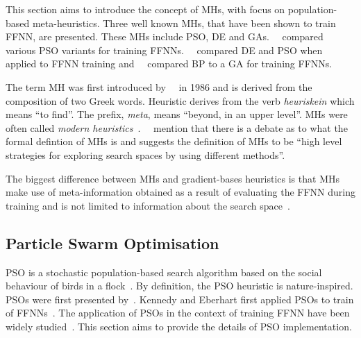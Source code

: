 This section aims to introduce the concept of \acp{MH}, with focus on population-based meta-heuristics. Three well known \acp{MH}, that have been shown to train \acs{FFNN}, are presented. These \acp{MH} include \acf{PSO}, \acf{DE} and \acfp{GA}.~\citeauthor{ref:carvalho:2006}~\cite{ref:carvalho:2006} compared various \acs{PSO} variants for training \acp{FFNN}.~\citeauthor{ref:espinal:2011}~\cite{ref:espinal:2011} compared \acs{DE} and \acs{PSO} when applied to \acs{FFNN} training and~\citeauthor{ref:gupta:1999}~\cite{ref:gupta:1999} compared \acs{BP} to a \acs{GA} for training \acp{FFNN}.

The term \acf{MH} was first introduced by~\citeauthor{ref:glover:1986}~\cite{ref:glover:1986} in 1986 and is derived from the composition of two Greek words. Heuristic derives from the verb \textit{heuriskein} which means ``to find''. The prefix, \textit{meta}, means ``beyond, in an upper level''. \Acp{MH} were often called \textit{modern heuristics}~\cite{ref:reeves:1993}.~\citeauthor{ref:blum:2003}~\cite{ref:blum:2003} mention that there is a debate as to what the formal defintion of \acp{MH} is and suggests the definition of \acp{MH} to be ``high level strategies for exploring search spaces by using different methods''.

The biggest difference between \acp{MH} and gradient-bases heuristics is that
\acp{MH} make use of meta-information obtained as a result of evaluating the \acs{FFNN} during training and is not limited to information about the search space~\cite{ref:blum:2003}.


\subsection{Particle Swarm Optimisation}\label{sec:heuristics:mh:pso}

\Acf{PSO} is a stochastic population-based search algorithm based on the social behaviour of birds in a flock~\cite{ref:kennedy:1995}. By definition, the \acs{PSO} heuristic is nature-inspired.  \Acp{PSO} were first presented  by~\citeauthor{ref:kennedy:1995}\cite{ref:kennedy:1995}. Kennedy and Eberhart first applied \acp{PSO} to train of \acp{FFNN}~\cite{ref:eberhart:1995, ref:kennedy:1997}. The application of \acp{PSO} in the context of training \acs{FFNN} have been widely studied~\cite{ref:rakitianskaia:2012, ref:vanwyk:2014}. This section aims to provide the details of \acs{PSO} implementation.

